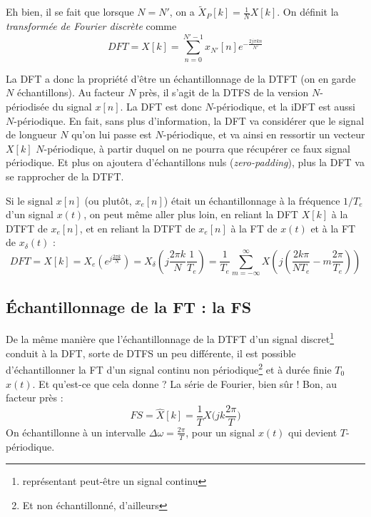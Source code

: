 \documentclass{article}
\begin{document}
Eh bien, il se fait que lorsque $N=N'$, on a $\tilde{X}_P[k] = \frac{1}{N}X[k]$. On définit la \emph{transformée de Fourier discrète} comme
\begin{equation}
DFT = X[k] = \sum_{n=0}^{N'-1} x_{N'}[n] e^{-\frac{2j\pi k n}{N'}}
\label{eq:dft_def}
\end{equation}

La DFT a donc la propriété d'être un échantillonnage de la DTFT (on en garde $N$ échantillons). Au facteur $N$ près, il s'agit de la DTFS de la version $N$-périodisée du signal $x[n]$. La DFT est donc $N$-périodique, et la iDFT est aussi $N$-périodique. En fait, sans plus d'information, la DFT va considérer que le signal de longueur $N$ qu'on lui passe est $N$-périodique, et va ainsi en ressortir un vecteur $X[k]$ $N$-périodique, à partir duquel on ne pourra que récupérer ce faux signal périodique. Et plus on ajoutera d'échantillons nuls (\emph{zero-padding}), plus la DFT va se rapprocher de la DTFT.

Si le signal $x[n]$ (ou plutôt, $x_e[n]$) était un échantillonnage à la fréquence $1/T_e$ d'un signal $x(t)$, on peut même aller plus loin, en reliant la DFT $X[k]$ à la DTFT de $x_e[n]$, et en reliant la DTFT de $x_e[n]$ à la FT de $x(t)$ et à la FT de $x_\delta(t)$ :
\begin{equation}
DFT = X[k] = X_e\left(e^{j \frac{2\pi k}{N}}\right) = X_\delta\left(j \frac{2\pi k}{N}\frac{1}{T_e}\right) = \frac{1}{T_e} \sum_{m=-\infty}^{\infty} X\left(j\left( \frac{2k\pi}{N T_e} - m \frac{2\pi}{T_e} \right)\right)
\label{eq:dft_dtft_ft_delta_ft_relationships}
\end{equation}

\subsection{Échantillonnage de la FT : la FS}

De la même manière que l'échantillonnage de la DTFT d'un signal discret\footnote{représentant peut-être un signal continu} conduit à la DFT, sorte de DTFS un peu différente, il est possible d'échantillonner la FT d'un signal continu non périodique\footnote{Et non échantillonné, d'ailleurs} et à durée finie $T_0$ $x(t)$. Et qu'est-ce que cela donne ? La série de Fourier, bien sûr ! Bon, au facteur près :
\begin{equation}
FS = \hat{X}[k] = \frac{1}{T} X\bigg(j k \frac{2\pi}{T}\bigg)
\label{eq:fs_from_ft_sampling}
\end{equation}
On échantillonne à un intervalle $\Delta\omega = \frac{2\pi}{T}$, pour un signal $x(t)$ qui devient $T$-périodique.
\end{document}
